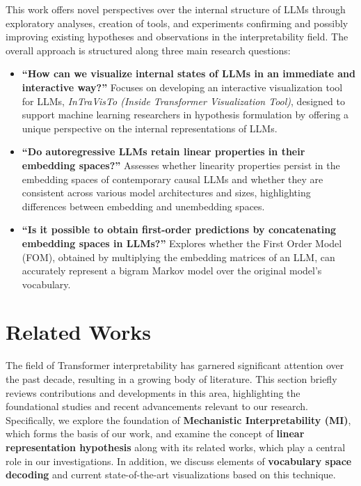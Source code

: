 \documentclass[11pt,a4paper,twocolumn]{article}
\begin{document}
This work offers novel perspectives over the internal structure of LLMs through exploratory analyses, creation of tools, and experiments confirming and possibly improving existing hypotheses and observations in the interpretability field.
The overall approach is structured along three main research questions: 
\begin{itemize}[leftmargin=12pt]
    \item \textbf{``How can we visualize internal states of LLMs in an immediate and interactive way?''} Focuses on developing an interactive visualization tool for LLMs, \emph{InTraVisTo (Inside Transformer Visualization Tool)}, designed to support machine learning researchers in hypothesis formulation by offering a unique perspective on the internal representations of LLMs.
    \item \textbf{``Do autoregressive LLMs retain linear properties in their embedding spaces?''} Assesses whether linearity properties persist in the embedding spaces of contemporary causal LLMs and whether they are consistent across various model architectures and sizes, highlighting differences between embedding and unembedding spaces.
    \item \textbf{``Is it possible to obtain first-order predictions by concatenating embedding spaces in LLMs?''} Explores whether the First Order Model (FOM), obtained by multiplying the embedding matrices of an LLM, can accurately represent a bigram Markov model over the original model's vocabulary.
\end{itemize}

\section{Related Works}\label{sec:related_works}
The field of Transformer interpretability has garnered significant attention over the past decade, resulting in a growing body of literature.
This section briefly reviews contributions and developments in this area, highlighting the foundational studies and recent advancements relevant to our research.
Specifically, we explore the foundation of \textbf{Mechanistic Interpretability (MI)}, which forms the basis of our work, and examine the concept of \textbf{linear representation hypothesis} along with its related works, which play a central role in our investigations.
In addition, we discuss elements of \textbf{vocabulary space decoding} and current state-of-the-art visualizations based on this technique.
\end{document}
